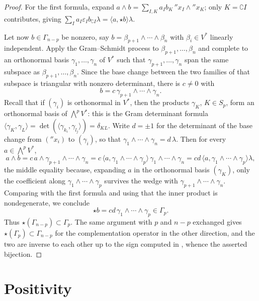 \begin{proof}
For the first formula, expand
$a\wedge b=\sum_{I,K}a_Ib_K\,\dprime x_I\wedge\dprime x_K$; only $K=\complement I$
contributes, giving $\sum_Ia_I\varepsilon_Ib_{\complement I}\lambda
=\langle a,\star b\rangle\lambda$.

Let now $b\in\Gamma_{n-p}$ be nonzero, say
$b=\beta_{p+1}\wedge\cdots\wedge\beta_n$ with $\beta_i\in V^*$ linearly
independent.  Apply the Gram--Schmidt process to
$\beta_{p+1},\ldots,\beta_n$ and complete to an orthonormal basis
$\gamma_1,\ldots,\gamma_n$ of $V^*$ such that
$\gamma_{p+1},\ldots,\gamma_n$ span the same subspace as
$\beta_{p+1},\ldots,\beta_n$.  Since the base change between the two families
of that subspace is triangular with nonzero determinant, there is $c\neq0$
with
\[
 b=c\,\gamma_{p+1}\wedge\cdots\wedge\gamma_n .
\]
Recall that if $(\gamma_i)$ is orthonormal in $V^*$, then the products
$\gamma_K$, $K\in S_p$, form an orthonormal basis of $\bigwedge^pV^*$: this is
the Gram determinant formula
$\langle\gamma_K,\gamma_L\rangle=\det(\langle\gamma_{k_i},\gamma_{l_j}\rangle)
=\delta_{KL}$.  Write $d=\pm1$ for the determinant of the base change from
$(\dprime x_i)$ to $(\gamma_i)$, so that
$\gamma_1\wedge\cdots\wedge\gamma_n=d\,\lambda$.  Then for every
$a\in\bigwedge^pV^*$,
\[
 a\wedge b
 =c\,a\wedge\gamma_{p+1}\wedge\cdots\wedge\gamma_n
 =c\,\bigl\langle a,\gamma_1\wedge\cdots\wedge\gamma_p\bigr\rangle\,
   \gamma_1\wedge\cdots\wedge\gamma_n
 =cd\,\bigl\langle a,\gamma_1\wedge\cdots\wedge\gamma_p\bigr\rangle\lambda,
\]
the middle equality because, expanding $a$ in the orthonormal basis
$(\gamma_K)$, only the coefficient along $\gamma_1\wedge\cdots\wedge\gamma_p$
survives the wedge with $\gamma_{p+1}\wedge\cdots\wedge\gamma_n$.  Comparing
with the first formula and using that the inner product is nondegenerate, we
conclude
\[
 \star b=cd\,\gamma_1\wedge\cdots\wedge\gamma_p\in\Gamma_p .
\]
Thus $\star(\Gamma_{n-p})\subset\Gamma_p$.  The same argument with $p$ and
$n-p$ exchanged gives $\star(\Gamma_p)\subset\Gamma_{n-p}$ for the
complementation operator in the other direction, and the two are inverse to
each other up to the sign computed in
, whence the asserted bijection.
\end{proof}

\section{Positivity}
\label{sec:ch09-positivity}

